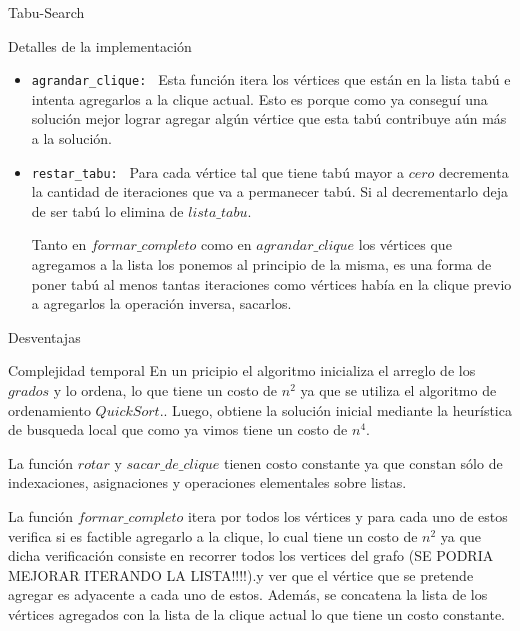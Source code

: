 \begin{section}{Tabu-Search}
\begin{subsection}{Detalles de la implementación}
\begin{itemize}
			\texttt{Observación: } Al agregar condicionamos la clique resultante al igual que pasa al sacar sin hacer rotaciones (depende del orden en que lo hagamos la calidad de la solución). Es decir, encontrar una mejor solución depende del orden en que agreguemos los vértices, podriamos también hacer rotaciones para agregar pero esto aumentaría en $n$ la complejidad. Buscando un equilibrio entre eficiencia y calidad de la solución, decidimos que hacer ambas rotaciones (agregar, sacar) tenia una complejidad ....

			\item \texttt{agrandar\_clique: } Esta función itera los vértices que están en la lista tabú e intenta agregarlos a la clique actual. Esto es porque como ya conseguí una solución mejor lograr agregar algún vértice que esta tabú contribuye aún más a la solución.

			\item \texttt{restar\_tabu: } Para cada vértice tal que tiene tabú mayor a $cero$ decrementa la cantidad de iteraciones que va a permanecer tabú. Si al decrementarlo deja de ser tabú lo elimina de $lista\_tabu$.

			Tanto en $formar\_completo$ como en $agrandar\_clique$ los vértices que agregamos a la lista los ponemos al principio de la misma, es una forma de poner tabú al menos tantas iteraciones como vértices había en la clique previo a agregarlos la operación inversa, sacarlos.
		\end{itemize}
	\end{subsection}

	\begin{subsection}{Desventajas}
	
	\end{subsection}

	\begin{subsection}{Complejidad temporal}
			En un pricipio el algoritmo inicializa el arreglo de los $grados$ y lo ordena, lo que tiene un costo de $n^2$ ya que se utiliza el algoritmo de ordenamiento $QuickSort$.. Luego, obtiene la solución inicial mediante la heurística de busqueda local que como ya vimos tiene un costo de $n^4$.

			La función $rotar$ y $sacar\_de\_clique$ tienen costo constante ya que constan sólo de indexaciones, asignaciones y operaciones elementales sobre listas.

			La función $formar\_completo$ itera por todos los vértices y para cada uno de estos verifica si es factible agregarlo a la clique, lo cual tiene un costo de $n^2$ ya que dicha verificación consiste en recorrer todos los vertices del grafo (SE PODRIA MEJORAR ITERANDO LA LISTA!!!!).y ver que el vértice que se pretende agregar es adyacente a cada uno de estos. Además, se concatena la lista de los vértices agregados con la lista de la clique actual lo que tiene un costo constante.


\end{subsection}
\end{section}
